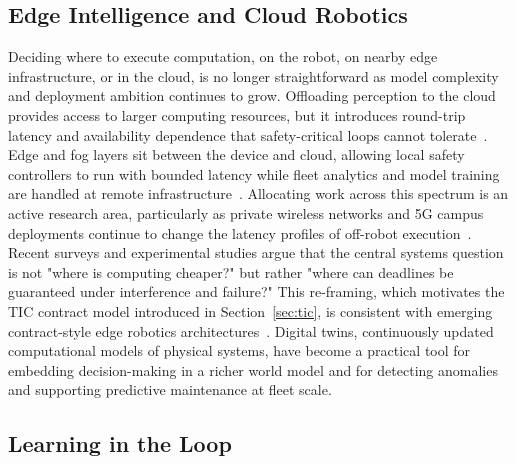 \documentclass[smallextended]{svjour3}
\begin{document}
\subsection{Edge Intelligence and Cloud Robotics}

Deciding where to execute computation, on the robot, on nearby edge
infrastructure, or in the cloud, is no longer straightforward as model
complexity and deployment ambition continues to grow. Offloading perception to the cloud provides access to larger computing resources, but it introduces round-trip latency and availability dependence that safety-critical loops cannot tolerate~\cite{kuffner2010}. 
Edge and fog layers sit between the device and cloud, allowing local safety controllers to run with bounded latency while fleet analytics and model training are handled at remote infrastructure~\cite{huang2021edgerobotics,shi2016}. Allocating work across this spectrum is an active research area, particularly as private wireless networks and 5G campus deployments continue to change the latency profiles of off-robot execution~\cite{pfeiffer2017fiveg,urbaniak2024fiveg}.
Recent surveys and experimental studies argue that the central systems question is not "where is computing cheaper?" but rather "where can deadlines be guaranteed under interference and failure?" This re-framing, which motivates the TIC contract model
introduced in Section~\ref{sec:tic}, is consistent with
emerging contract-style edge robotics
architectures~\cite{palau2024edgerobotics}.
Digital twins, continuously updated computational models of physical systems, have become a practical tool for embedding decision-making in a richer world model and for detecting anomalies and supporting predictive maintenance at fleet scale.

\subsection{Learning in the Loop}
\end{document}
